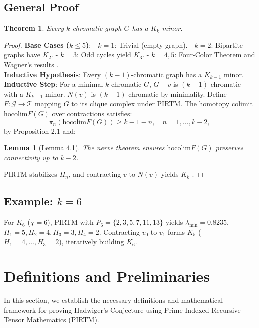 \documentclass[11pt]{article}
\theoremstyle{plain}
\newtheorem{theorem}{Theorem}
\newtheorem{lemma}{Lemma}
\begin{document}
\subsection{General Proof}
\begin{theorem}
Every \( k \)-chromatic graph \( G \) has a \( K_k \) minor.
\end{theorem}
\begin{proof}
\textbf{Base Cases (\( k \leq 5 \))}:  
- \( k = 1 \): Trivial (empty graph).  
- \( k = 2 \): Bipartite graphs have \( K_2 \).  
- \( k = 3 \): Odd cycles yield \( K_3 \).  
- \( k = 4, 5 \): Four-Color Theorem and Wagner’s results \cite{wagner1937}. \\
\textbf{Inductive Hypothesis}: Every \( (k-1) \)-chromatic graph has a \( K_{k-1} \) minor. \\
\textbf{Inductive Step}: For a minimal \( k \)-chromatic \( G \), \( G - v \) is \( (k-1) \)-chromatic with a \( K_{k-1} \) minor. \( N(v) \) is \( (k-1) \)-chromatic by minimality. Define \( F: \mathcal{G} \to \mathcal{T} \) mapping \( G \) to its clique complex under PIRTM. The homotopy colimit \( \text{hocolim} F(G) \) over contractions satisfies:
\[
\pi_n(\text{hocolim} F(G)) \geq k - 1 - n, \quad n = 1, \ldots, k-2,
\]
by Proposition 2.1 and:
\begin{lemma}[Lemma 4.1]
The nerve theorem \cite{bousfield1977} ensures \( \text{hocolim} F(G) \) preserves connectivity up to \( k-2 \).
\end{lemma}
PIRTM stabilizes \( H_n \), and contracting \( v \) to \( N(v) \) yields \( K_k \) \cite{robertson1993}.
\end{proof}
\subsection{Example: \( k = 6 \)}
For \( K_6 \) (\( \chi = 6 \)), PIRTM with \( P_6 = \{2, 3, 5, 7, 11, 13\} \) yields \( \lambda_{\text{min}} = 0.8235 \), \( H_1 = 5, H_2 = 4, H_3 = 3, H_4 = 2 \). Contracting \( v_0 \) to \( v_1 \) forms \( K_5 \) (\( H_1 = 4, \ldots, H_3 = 2 \)), iteratively building \( K_6 \).



\section{Definitions and Preliminaries}

In this section, we establish the necessary definitions and mathematical framework for proving Hadwiger's Conjecture using Prime-Indexed Recursive Tensor Mathematics (PIRTM). 
\end{document}
